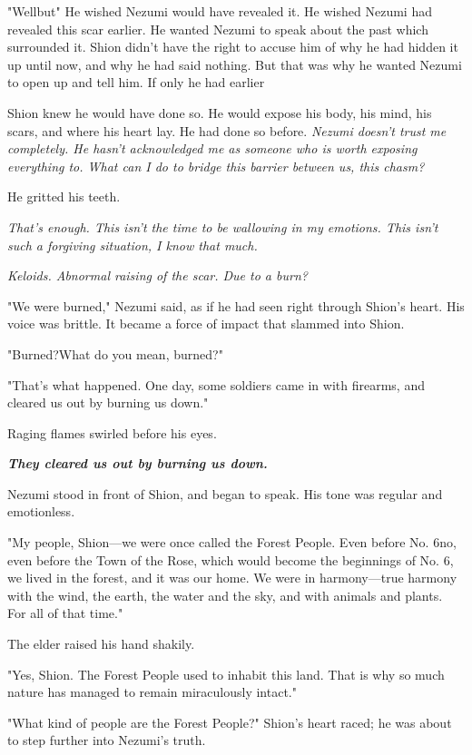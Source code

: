 "Well\el but\el " He wished Nezumi would have revealed it. He wished
Nezumi had revealed this scar earlier. He wanted Nezumi to speak about
the past which surrounded it. Shion didn't have the right to accuse him
of why he had hidden it up until now, and why he had said nothing. But
that was why he wanted Nezumi to open up and tell him. If only he had
earlier\el 

Shion knew he would have done so. He would expose his body, his mind,
his scars, and where his heart lay. He had done so before. \emph{Nezumi
doesn't trust me completely. He hasn't acknowledged me as someone who is
worth exposing everything to. What can I do to bridge this barrier
between us, this chasm?}

He gritted his teeth.

\emph{That's enough. This isn't the time to be wallowing in my emotions. This
isn't such a forgiving situation, I know that much.}

\emph{Keloids. Abnormal raising of the scar. Due to a burn?}

"We were burned," Nezumi said, as if he had seen right through Shion's
heart. His voice was brittle. It became a force of impact that slammed
into Shion.

"Burned?\el What do you mean, burned?"

"That's what happened. One day, some soldiers came in with firearms, and
cleared us out by burning us down."

Raging flames swirled before his eyes.

\emph{\textbf{They cleared us out by burning us down.}}

Nezumi stood in front of Shion, and began to speak. His tone was regular
and emotionless.

"My people, Shion---we were once called the Forest People. Even before
No. 6\el no, even before the Town of the Rose, which would become the
beginnings of No. 6, we lived in the forest, and it was our home. We
were in harmony---true harmony with the wind, the earth, the water and the
sky, and with animals and plants. For all of that time."

The elder raised his hand shakily.

"Yes, Shion. The Forest People used to inhabit this land. That is why so
much nature has managed to remain miraculously intact."

"What kind of people are the Forest People?" Shion's heart raced; he was
about to step further into Nezumi's truth.

